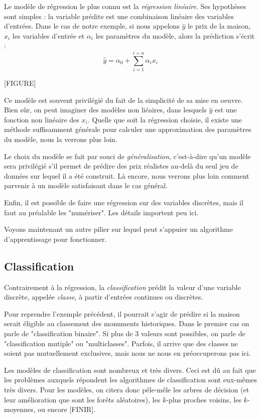 Le modèle de régression le plus connu est la \emph{régression linéaire}. Ses hypothèses sont simples : la variable prédite   est une combinaison linéaire des variables d'entrées. Dans le cas de notre exemple, si nous appelons $\hat y$ le prix de la maison, $x_i$ les variables d'entrée et $\alpha_i$ les paramètres du modèle, alors la prédiction s'écrit :
\begin{equation}
\hat y = \alpha_0 + \sum_{i = 1}^{i = n}{\alpha_i x_i}
\end{equation}

[FIGURE]

Ce modèle est souvent privilégié du fait de la simplicité de sa mise en oeuvre. Bien sûr, on peut imaginer des modèles non liéaires, dans lesquels $\hat y$ est une fonction non linéaire des $x_i$. Quelle que soit la régression choisie, il existe une méthode suffisamment générale pour calculer une approximation des paramètres du modèle, nous la verrons plus loin.

Le choix du modèle se fait par souci de \emph{généralisation}, c'est-à-dire qu'un modèle sera privilégié s'il permet de prédire des prix réalistes au-delà du seul jeu de données sur lequel il a été construit. Là encore, nous verrons plus loin comment parvenir à un modèle satisfaisant dans le cas général. 

Enfin, il est possible de faire une régression sur des variables discrètes, mais il faut au préalable les "numériser". Les détails importent peu ici.

Voyons maintenant un autre pilier sur lequel peut s'appuier un algorithme d'apprentissage pour fonctionner.

\subsection{Classification} 
Contrairement à la régression, la \emph{classification} prédit la valeur d'une variable discrète, appelée \emph{classe}, à partir d'entrées continues ou discrètes.

Pour reprendre l'exemple précédent, il pourrait s'agir de prédire si la maison serait éligible au classement des monuments historiques. Dans le premier cas on parle de "classification binaire". Si plus de 3 valeurs sont possibles, on parle de "classification mutiple" ou "multiclasses". Parfois, il arrive que des classes ne soient pas mutuellement exclusives, mais nous ne nous en préoccuperons pas ici.

Les modèles de classification sont nombreux et très divers. Ceci est dû au fait que les problèmes auxquels répondent les algorithmes de classification sont eux-mêmes très divers. Pour les modèles, on citera donc pêle-mêle les arbres de décision (et leur amélioration que sont les forêts aléatoires), les $k$-plus proches voisins, les $k$-moyennes, ou encore [FINIR]. 

